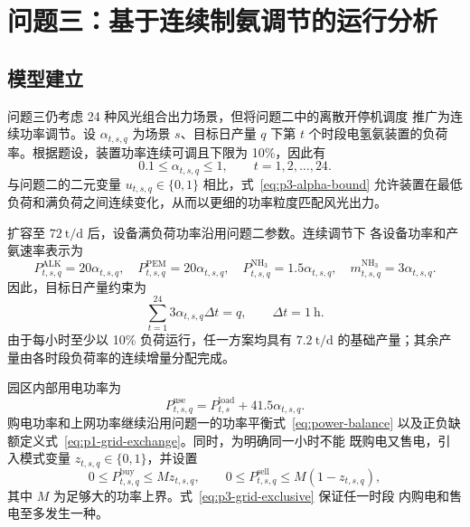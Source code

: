 \section{问题三：基于连续制氨调节的运行分析}

\subsection{模型建立}

问题三仍考虑 24 种风光组合出力场景，但将问题二中的离散开停机调度
推广为连续功率调节。设 $\alpha_{t,s,q}$ 为场景 $s$、目标日产量 $q$
下第 $t$ 个时段电氢氨装置的负荷率。根据题设，装置功率连续可调且下限为
10\%，因此有
\begin{equation}
  0.1 \leq \alpha_{t,s,q} \leq 1,
  \qquad t=1,2,\dots,24.
  \label{eq:p3-alpha-bound}
\end{equation}
与问题二的二元变量 $u_{t,s,q}\in\{0,1\}$ 相比，式~\eqref{eq:p3-alpha-bound}
允许装置在最低负荷和满负荷之间连续变化，从而以更细的功率粒度匹配风光出力。

扩容至 $72~\mathrm{t/d}$ 后，设备满负荷功率沿用问题二参数。连续调节下
各设备功率和产氨速率表示为
\begin{equation}
  P_{t,s,q}^{\mathrm{ALK}}=20\alpha_{t,s,q},\quad
  P_{t,s,q}^{\mathrm{PEM}}=20\alpha_{t,s,q},\quad
  P_{t,s,q}^{\mathrm{NH_3}}=1.5\alpha_{t,s,q},\quad
  m_{t,s,q}^{\mathrm{NH_3}}=3\alpha_{t,s,q}.
  \label{eq:p3-device-power}
\end{equation}
因此，目标日产量约束为
\begin{equation}
  \sum_{t=1}^{24}3\alpha_{t,s,q}\Delta t=q,
  \qquad \Delta t=1~\mathrm{h}.
  \label{eq:p3-production}
\end{equation}
由于每小时至少以 10\% 负荷运行，任一方案均具有 $7.2~\mathrm{t/d}$
的基础产量；其余产量由各时段负荷率的连续增量分配完成。

园区内部用电功率为
\begin{equation}
  P_{t,s,q}^{\mathrm{use}}
  =P_{t,s}^{\mathrm{load}}+41.5\alpha_{t,s,q}.
  \label{eq:p3-use-power}
\end{equation}
购电功率和上网功率继续沿用问题一的功率平衡式~\eqref{eq:power-balance}
以及正负缺额定义式~\eqref{eq:p1-grid-exchange}。同时，为明确同一小时不能
既购电又售电，引入模式变量 $z_{t,s,q}\in\{0,1\}$，并设置
\begin{equation}
  0\leq P_{t,s,q}^{\mathrm{buy}}\leq Mz_{t,s,q},\qquad
  0\leq P_{t,s,q}^{\mathrm{sell}}\leq M(1-z_{t,s,q}),
  \label{eq:p3-grid-exclusive}
\end{equation}
其中 $M$ 为足够大的功率上界。式~\eqref{eq:p3-grid-exclusive} 保证任一时段
内购电和售电至多发生一种。

